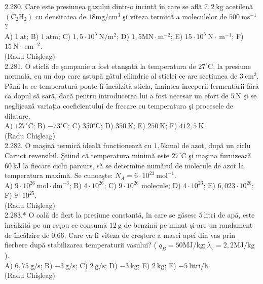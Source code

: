 2.280. Care este presiunea gazului dintr-o incintă în care se află $7,2 \mathrm{~kg}$ acetilenă $\left(\mathrm{C}_{2} \mathrm{H}_{2}\right)$ cu densitatea de $18 \mathrm{mg} / \mathrm{cm}^{3}$ şi viteza termică a moleculelor de $500 \mathrm{~ms}^{-1}$ ?\\ A) $1 \mathrm{~at}$; B) $1 \mathrm{~atm}$; C) $1,5 \cdot 10^{5} \mathrm{~N} / \mathrm{m}^{2}$; D) $1,5 \mathrm{MN} \cdot \mathrm{m}^{-2}$; E) $15 \cdot 10^{5} \mathrm{~N} \cdot \mathrm{~m}^{-1}$; F) $15 \mathrm{~N} \cdot \mathrm{~cm}^{-2}$.\\ (Radu Chişleag)\\

2.281. O sticlă de şampanie a fost etanşată la temperatura de $27^{\circ} \mathrm{C}$, la presiune normală, cu un dop care astupă gâtul cilindric al sticlei ce are secțiunea de $3 \mathrm{~cm}^{2}$. Până la ce temperatură poate fî încălzită sticla, înaintea începerii fermentării fără ca dopul să sară, dacă pentru introducerea lui a fost necesar un efort de $5 \mathrm{~N}$ şi se neglijează variația coeficientului de frecare cu temperatura şi procesele de dilatare.\\ A) $127^{\circ} \mathrm{C}$; B) $-73^{\circ} \mathrm{C}$; C) $350^{\circ} \mathrm{C}$; D) $350 \mathrm{~K}$; E) $250 \mathrm{~K}$; F) $412,5 \mathrm{~K}$.\\ (Radu Chişleag)\\

2.282. O maşină termică ideală funcționează cu $1,5 \mathrm{kmol}$ de azot, după un ciclu Carnot reversibil. Ştiind că temperatura minimă este $27^{\circ} \mathrm{C}$ şi maşina furnizează $60 \mathrm{~kJ}$ la fiecare ciclu parcurs, să se determine numărul de molecule de azot la temperatura maximă. Se cunoaşte: $N_{A}=6 \cdot 10^{23} \mathrm{~mol}^{-1}$.\\ A) $9 \cdot 10^{26} \mathrm{~mol} \cdot \mathrm{dm}^{-3}$; B) $4 \cdot 10^{26}$; C) $9 \cdot 10^{26}$ molecule; D) $4 \cdot 10^{23}$; E) $6,023 \cdot 10^{26}$; F) $9 \cdot 10^{25}$.\\ (Radu Chişleag)\\

2.283.* O oală de fiert la presiune constantă, în care se găsesc $5 \mathrm{~litri}$ de apă, este încălzită pe un reşou ce consumă $12 \mathrm{~g}$ de benzină pe minut şi are un randament de încǎlzire de 0,66. Care va fì viteza de creştere a masei apei din vas prin fierbere după stabilizarea temperaturii vasului? ( $q_{B}=50 \mathrm{MJ} / \mathrm{kg} ; \lambda_{v}=2,2 \mathrm{MJ} / \mathrm{kg}$ ).\\ A) $6,75 \mathrm{~g} / \mathrm{s}$; B) $-3 \mathrm{~g} / \mathrm{s}$; C) $2 \mathrm{~g} / \mathrm{s}$; D) $-3 \mathrm{~kg}$; E) $2 \mathrm{~kg}$; F) $-5 \mathrm{~litri} / \mathrm{h}$.\\ (Radu Chişleag)\\

